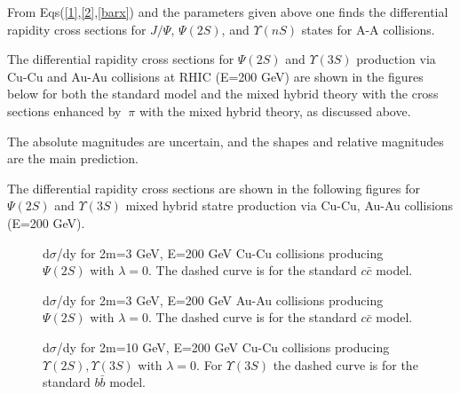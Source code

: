From Eqs(\ref{1},\ref{2},\ref{barx}) and the parameters given above
one finds the differential rapidity cross sections for  $J/\Psi$, $\Psi(2S)$,
and $\Upsilon(nS)$ states for A-A collisions.

The differential rapidity cross sections for $\Psi(2S)$ and $\Upsilon(3S)$ 
production via Cu-Cu and Au-Au collisions at RHIC (E=200 GeV) are shown in the 
figures below for both the standard model and the mixed hybrid theory
with the cross sections enhanced by $~\pi$ with the mixed hybrid theory,
 as discussed above.

 The absolute magnitudes are uncertain, and the shapes and relative magnitudes 
are the main prediction.

\clearpage

 The differential rapidity cross sections are shown in the 
following figures for $\Psi(2S)$ and $\Upsilon(3S)$ mixed hybrid statre
 production via Cu-Cu, Au-Au collisions (E=200 GeV).
\vspace{1.5cm}

\begin{figure}[ht]
\begin{center}
\caption{d$\sigma$/dy for 2m=3 GeV, E=200 GeV Cu-Cu collisions 
producing $\Psi(2S)$ with $\lambda=0$. The dashed curve is for the standard
$c\bar{c}$ model.}
\label{Figure 5}
\end{center}
\end{figure}
\vspace{2cm}

\begin{figure}[ht]
\begin{center}
\caption{d$\sigma$/dy for 2m=3 GeV, E=200 GeV Au-Au collisions 
producing $\Psi(2S)$ with $\lambda=0$. The dashed curve is for the standard
$c\bar{c}$ model.}
\label{Figure 6}
\end{center}
\end{figure}

\clearpage

\begin{figure}[ht]
\begin{center}
\caption{d$\sigma$/dy for 2m=10 GeV, E=200 GeV Cu-Cu collisions 
producing $\Upsilon(2S),\Upsilon(3S)$ with $\lambda=0$. For $\Upsilon(3S)$
the dashed curve is for the standard $b\bar{b}$ model.}
\label{Figure 9}
\end{center}
\end{figure}
\vspace{5 cm}

